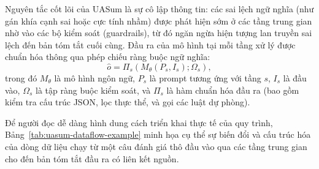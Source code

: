 Nguyên tắc cốt lõi của UASum là sự cô lập thông tin: các sai lệch ngữ nghĩa (như gán khía cạnh sai hoặc cực tính nhầm) được phát hiện sớm ở các tầng trung gian nhờ vào các bộ kiểm soát (guardrails), từ đó ngăn ngừa hiện tượng lan truyền sai lệch đến bản tóm tắt cuối cùng. Đầu ra của mô hình tại mỗi tầng xử lý được chuẩn hóa thông qua phép chiếu ràng buộc ngữ nghĩa:
\begin{equation}
\hat{o} = \Pi_s\left( M_{\theta}(P_s, I_s); \Omega_s \right),
\label{eq:method1-llm-as-controlled-operator}
\end{equation}
trong đó $M_{\theta}$ là mô hình ngôn ngữ, $P_s$ là prompt tương ứng với tầng $s$, $I_s$ là đầu vào, $\Omega_s$ là tập ràng buộc kiểm soát, và $\Pi_s$ là hàm chuẩn hóa đầu ra (bao gồm kiểm tra cấu trúc JSON, lọc thực thể, và gọi các luật dự phòng).

Để người đọc dễ dàng hình dung cách triển khai thực tế của quy trình, Bảng~\ref{tab:uasum-dataflow-example} minh họa cụ thể sự biến đổi và cấu trúc hóa của dòng dữ liệu chạy từ một câu đánh giá thô đầu vào qua các tầng trung gian cho đến bản tóm tắt đầu ra có liên kết nguồn.

